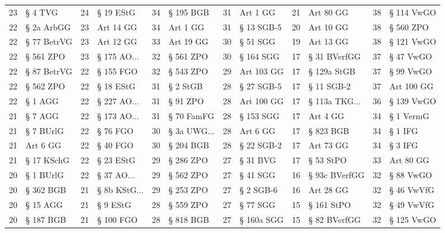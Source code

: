 \begin{tabular}{rlrlrlrlrlrl}
 23 &      § 4 TVG &  24 &      § 19 EStG &  34 &     § 195 BGB &  31 &    Art 1 GG &     21 &       Art 80 GG &     38 & § 114 VwGO \\
 22 &   § 2a ArbGG &  23 &      Art 14 GG &  34 &      Art 1 GG &  31 &  § 13 SGB-5 &     20 &       Art 10 GG &     38 &  § 560 ZPO \\
 22 &  § 77 BetrVG &  23 &      Art 12 GG &  33 &     Art 19 GG &  30 &    § 51 SGG &     19 &       Art 13 GG &     38 & § 121 VwGO \\
 22 &    § 561 ZPO &  23 &  § 175 AO... &  32 &     § 561 ZPO &  30 &   § 164 SGG &     17 &    § 31 BVerfGG &     37 &  § 47 VwGO \\
 22 &  § 87 BetrVG &  22 &      § 155 FGO &  32 &     § 543 ZPO &  29 &  Art 103 GG &     17 &     § 129a StGB &     37 &  § 99 VwGO \\
 22 &    § 562 ZPO &  22 &      § 18 EStG &  31 &      § 2 StGB &  28 &  § 27 SGB-5 &     17 &      § 11 SGB-2 &     37 & Art 100 GG \\
 22 &      § 1 AGG &  22 &  § 227 AO... &  31 &      § 91 ZPO &  28 &  Art 100 GG &     17 & § 113a TKG... &     36 & § 139 VwGO \\
 21 &      § 7 AGG &  22 &  § 173 AO... &  31 &    § 70 FamFG &  28 &   § 153 SGG &     17 &        Art 4 GG &     34 &  § 1 VermG \\
 21 &    § 7 BUrlG &  22 &       § 76 FGO &  30 & § 3a UWG... &  28 &    Art 6 GG &     17 &       § 823 BGB &     34 &    § 1 IFG \\
 21 &     Art 6 GG &  22 &       § 40 FGO &  30 &     § 204 BGB &  28 &  § 22 SGB-2 &     17 &       Art 73 GG &     34 &    § 3 IFG \\
 21 &   § 17 KSchG &  22 &      § 23 EStG &  29 &     § 286 ZPO &  27 &    § 31 BVG &     17 &       § 53 StPO &     33 &  Art 80 GG \\
 20 &    § 1 BUrlG &  22 &   § 37 AO... &  29 &     § 562 ZPO &  27 &    § 41 SGG &     16 &   § 93c BVerfGG &     32 &  § 88 VwGO \\
 20 &    § 362 BGB &  21 & § 8b KStG... &  29 &     § 253 ZPO &  27 &   § 2 SGB-6 &     16 &       Art 28 GG &     32 & § 46 VwVfG \\
 20 &     § 15 AGG &  21 &       § 9 EStG &  28 &     § 559 ZPO &  27 &    § 77 SGG &     15 &      § 161 StPO &     32 & § 49 VwVfG \\
 20 &    § 187 BGB &  21 &      § 100 FGO &  28 &     § 818 BGB &  27 &  § 160a SGG &     15 &    § 82 BVerfGG &     32 & § 125 VwGO \\

\end{tabular}
